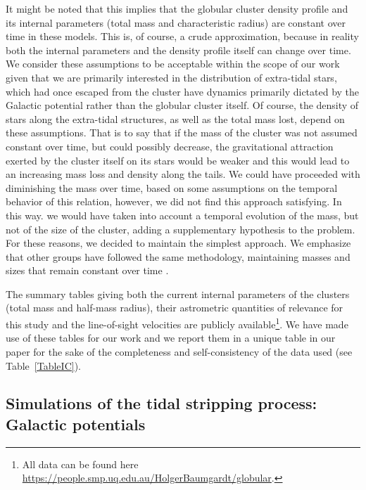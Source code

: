         It might be noted that this implies that the globular cluster density profile and its internal parameters (total mass and characteristic radius) are constant over time in these models. This is, of course, a crude approximation, because in reality both the internal parameters and the density profile itself can change over time. We consider these assumptions to be acceptable within the scope of our work given that we are primarily interested in the distribution of extra-tidal stars, which had once escaped from the cluster have dynamics primarily dictated by the Galactic potential rather than the globular cluster itself. Of course,  the density of stars along the extra-tidal structures, as well as the total mass lost, depend on these assumptions. That is to say that if the mass of the cluster was not assumed constant over time, but could possibly decrease, the gravitational attraction exerted by the cluster itself on its stars would be weaker and this would lead to an increasing mass loss and density along the tails. We could have proceeded with diminishing the mass over time, based on some assumptions on the temporal behavior of this relation, however, we did not find this approach satisfying. In this way. we would have taken into account a temporal evolution of the mass, but not of the size of the cluster, adding a supplementary hypothesis to the problem. For these reasons, we decided to maintain the simplest approach. We emphasize that other groups have followed the same methodology, maintaining masses and sizes that remain constant over time \citep[see, e.g.,][]{2019MNRAS.488.1535P}.

        The summary tables giving both the current internal parameters of the clusters (total mass and half-mass radius), their astrometric quantities of relevance for this study and the line-of-sight velocities are publicly available\footnote{All data can be found here \url{https://people.smp.uq.edu.au/HolgerBaumgardt/globular}.}. We have made use of these tables for our work and we report them in a unique table in our paper for the sake of the completeness and self-consistency of the data used (see Table~\ref{TableIC}). 

    \subsection{Simulations of the tidal stripping process: Galactic potentials}\label{galmod}
    
